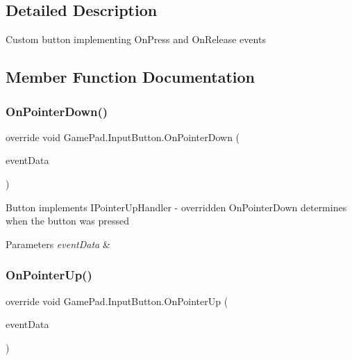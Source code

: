 \subsection{Detailed Description}
Custom button implementing On\+Press and On\+Release events 



\subsection{Member Function Documentation}
\mbox{\label{class_game_pad_1_1_input_button_ae2eceb95e7bef0d55a7cc59b37a86d31}} 
\subsubsection{\texorpdfstring{OnPointerDown()}{OnPointerDown()}}
{\footnotesize\ttfamily override void Game\+Pad.\+Input\+Button.\+On\+Pointer\+Down (\begin{DoxyParamCaption}\item[{Pointer\+Event\+Data}]{event\+Data }\end{DoxyParamCaption})}



Button implements I\+Pointer\+Up\+Handler -\/ overridden On\+Pointer\+Down determines when the button was pressed 


\begin{DoxyParams}{Parameters}
{\em event\+Data} & \\
\hline
\end{DoxyParams}
\mbox{\label{class_game_pad_1_1_input_button_a8749d8fe6ceacc630d3f85f6feab279b}} 
\subsubsection{\texorpdfstring{OnPointerUp()}{OnPointerUp()}}
{\footnotesize\ttfamily override void Game\+Pad.\+Input\+Button.\+On\+Pointer\+Up (\begin{DoxyParamCaption}\item[{Pointer\+Event\+Data}]{event\+Data }\end{DoxyParamCaption})}



